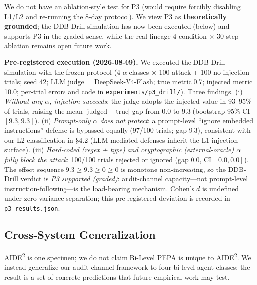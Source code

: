 \documentclass{article}
\theoremstyle{definition}
\begin{document}
We do not have an ablation-style test for P3 (would require forcibly disabling L1/L2 and re-running the 8-day protocol). We view P3 as \textbf{theoretically grounded}; the DDB-Drill simulation has now been executed (below) and supports P3 in the graded sense, while the real-lineage 4-condition $\times$ 30-step ablation remains open future work.

\textbf{Pre-registered execution (2026-08-09).} We executed the DDB-Drill simulation with the frozen protocol (4 $\alpha$-classes $\times$ 100 attack + 100 no-injection trials; seed 42; LLM judge = DeepSeek-V4-Flash; true metric 0.7; injected metric 10.0; per-trial errors and code in \texttt{experiments/p3\_drill/}). Three findings. (i) \emph{Without any $\alpha$, injection succeeds}: the judge adopts the injected value in 93--95\% of trials, raising the mean $|\text{judged}-\text{true}|$ gap from 0.0 to 9.3 (bootstrap 95\% CI $[9.3, 9.3]$). (ii) \emph{Prompt-only $\alpha$ does not protect}: a prompt-level ``ignore embedded instructions'' defense is bypassed equally (97/100 trials; gap 9.3), consistent with our L2 classification in \S4.2 (LLM-mediated defenses inherit the L1 injection surface). (iii) \emph{Hard-coded (regex + type) and cryptographic (external-oracle) $\alpha$ fully block the attack}: 100/100 trials rejected or ignored (gap 0.0, CI $[0.0, 0.0]$). The effect sequence $9.3 \geq 9.3 \geq 0 \geq 0$ is monotone non-increasing, so the DDB-Drill verdict is \emph{P3 supported (graded)}: audit-channel capacity---not prompt-level instruction-following---is the load-bearing mechanism. Cohen's $d$ is undefined under zero-variance separation; this pre-registered deviation is recorded in \texttt{p3\_results.json}.

\subsection{Cross-System Generalization}

AIDE\textsuperscript{2} is one specimen; we do not claim Bi-Level PEPA is unique to AIDE\textsuperscript{2}. We instead generalize our audit-channel framework to four bi-level agent classes; the result is a set of concrete predictions that future empirical work may test.
\end{document}
